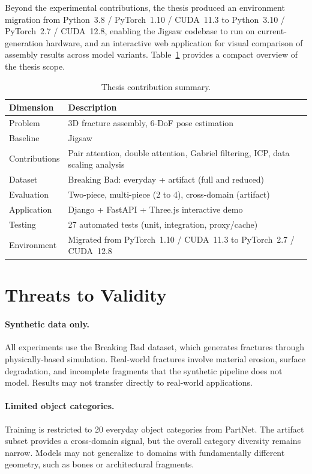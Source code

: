 Beyond the experimental contributions, the thesis produced an environment migration from Python~3.8 / PyTorch~1.10 / CUDA~11.3 to Python~3.10 / PyTorch~2.7 / CUDA~12.8, enabling the Jigsaw codebase to run on current-generation hardware, and an interactive web application for visual comparison of assembly results across model variants. Table~\ref{tab:contribution_summary} provides a compact overview of the thesis scope.

\begin{table}[h]
\centering
\caption{Thesis contribution summary.}
\label{tab:contribution_summary}
\begin{tabular}{ll}
\toprule
\textbf{Dimension} & \textbf{Description} \\
\midrule
Problem & 3D fracture assembly, 6-DoF pose estimation \\
Baseline & Jigsaw \cite{lu2023jigsaw} \\
Contributions & Pair attention, double attention, Gabriel filtering, ICP, data scaling analysis \\
Dataset & Breaking Bad: everyday + artifact (full and reduced) \\
Evaluation & Two-piece, multi-piece (2 to 4), cross-domain (artifact) \\
Application & Django + FastAPI + Three.js interactive demo \\
Testing & 27 automated tests (unit, integration, proxy/cache) \\
Environment & Migrated from PyTorch~1.10 / CUDA~11.3 to PyTorch~2.7 / CUDA~12.8 \\
\bottomrule
\end{tabular}
\end{table}

\section{Threats to Validity}

\paragraph{Synthetic data only.} All experiments use the Breaking Bad dataset, which generates fractures through physically-based simulation. Real-world fractures involve material erosion, surface degradation, and incomplete fragments that the synthetic pipeline does not model. Results may not transfer directly to real-world applications.

\paragraph{Limited object categories.} Training is restricted to 20 everyday object categories from PartNet. The artifact subset provides a cross-domain signal, but the overall category diversity remains narrow. Models may not generalize to domains with fundamentally different geometry, such as bones or architectural fragments.

